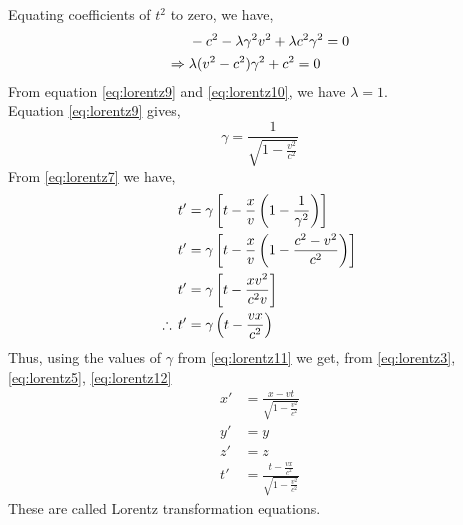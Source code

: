 \documentclass[../main-sheet.tex]{subfiles}
\begin{document}
Equating coefficients of \(t^2\) to zero, we have,
\begin{align}
    &-c^2-\lambda\gamma^2v^2+\lambda c^2\gamma^2=0\notag\\
    \Rightarrow\;&\lambda(v^2-c^2)\gamma^2+c^2=0\label{eq:lorentz10}
\end{align}
From equation \eqref{eq:lorentz9} and \eqref{eq:lorentz10}, we have \(\lambda=1\).\\
Equation \eqref{eq:lorentz9} gives,
\begin{equation}
    \gamma=\frac{1}{\sqrt{1-\frac{v^2}{c^2}}}\label{eq:lorentz11}
\end{equation}
From \eqref{eq:lorentz7} we have,
\begin{align}
    t'&=\gamma\left[ t-\frac{x }{v }\left( 1-\frac{1 }{\gamma^2} \right) \right]\notag\\
    t'&=\gamma\left[ t-\frac{x }{v }\left( 1-\frac{c^2-v^2}{c^2} \right) \right]\notag\\
    t'&=\gamma\left[ t-\frac{xv^2 }{c^2v }\right]\notag\\
    \therefore\,t'&=\gamma\left( t-\frac{vx }{c^2 }\right)\label{eq:lorentz12}
\end{align}
Thus, using the values of \(\gamma\) from \eqref{eq:lorentz11} we get, from \eqref{eq:lorentz3}, \eqref{eq:lorentz5}, \eqref{eq:lorentz12}
\begin{align*}
    x'&=\frac{x-vt }{\sqrt{1-\frac{v^2}{c^2}}}\\
    y'&=y\\
    z'&=z\\
    t'&=\frac{t-\frac{vx}{c^2} }{\sqrt{1-\frac{v^2}{c^2}}}
\end{align*}
These are called Lorentz transformation equations.
\end{document}
